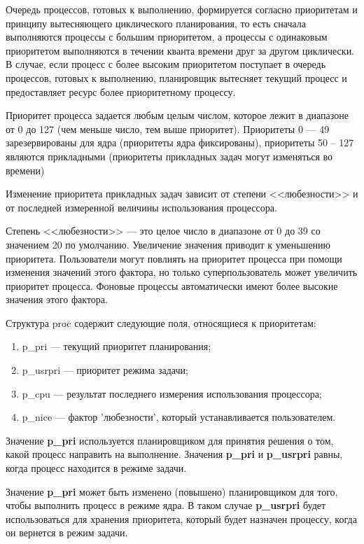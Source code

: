Очередь процессов, готовых к выполнению, формируется согласно приоритетам и принципу вытесняющего циклического планирования, то есть сначала выполняются процессы с большим приоритетом, а процессы с одинаковым приоритетом выполняются в течении кванта времени друг за другом циклически. 
В случае, если процесс с более высоким приоритетом поступает в очередь процессов, готовых к выполнению, планировщик вытесняет текущий процесс и предоставляет ресурс более приоритетному процессу.

Приоритет процесса задается любым целым числом, которое лежит в диапазоне от 0 до 127 (чем меньше число, тем выше приоритет). Приоритеты 0 --- 49 зарезервированы для ядра (приоритеты ядра фиксированы), приоритеты 50 -- 127 являются прикладными  (приоритеты прикладных задач могут изменяться во времени)

Изменение приоритета прикладных задач зависит от степени <<любезности>> и от последней измеренной величины использования процессора.

Степень <<любезности>> --- это целое число в диапазоне от 0 до 39 со значением 20 по умолчанию. 
Увеличение значения приводит к уменьшению приоритета.
Пользователи могут повлиять на приоритет процесса при помощи изменения значений этого фактора, но только суперпользователь может увеличить приоритет процесса.
Фоновые процессы автоматически имеют более высокие значения этого фактора.

Структура proc содержит следующие поля, относящиеся к приоритетам:
\begin{enumerate}[label=\arabic*)]
	\item p\_pri --- текущий приоритет планирования;
	\item p\_usrpri --- приоритет режима задачи;
	\item p\_cpu --- результат последнего измерения использования процессора;
	\item p\_nice --- фактор 'любезности', который устанавливается пользователем.
\end{enumerate}

Значение \textbf{p\_pri} используется планировщиком для принятия решения о том, какой процесс направить на выполнение. Значения \textbf{p\_pri} и \textbf{p\_usrpri} равны, когда процесс находится в режиме задачи. 

Значение \textbf{p\_pri} может быть изменено (повышено) планировщиком для того, чтобы выполнить процесс в режиме ядра. В таком случае \textbf{p\_usrpri} будет использоваться для хранения приоритета, который будет назначен процессу, когда он вернется в режим задачи.

